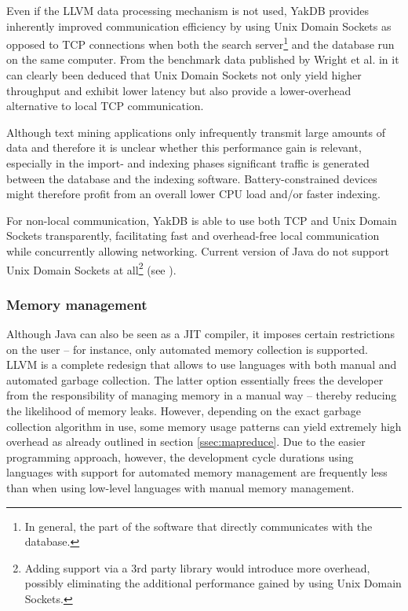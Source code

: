 \documentclass[a4paper, 12pt, twoside, reqn]{report}
\numberwithin{figure}{chapter}
\newtheorem[L]{boxedDefinition}{Definition}
\newtheorem[L]{boxedExample}{Example}
\begin{document}
Even if the LLVM data processing mechanism is not used, YakDB provides inherently improved communication efficiency by using Unix Domain Sockets as opposed to TCP connections when both the search server\footnote{In general, the part of the software that directly communicates with the database.} and the database run on the same computer. From the benchmark data published by Wright et al. in \cite{wright2007performance} it can clearly been deduced that Unix Domain Sockets not only yield higher throughput and exhibit lower latency but also provide a lower-overhead alternative to local TCP communication.

Although text mining applications only infrequently transmit large amounts of data and therefore it is unclear whether this performance gain is relevant, especially in the import- and indexing phases significant traffic is generated between the database and the indexing software. Battery-constrained devices might therefore profit from an overall lower CPU load and/or faster indexing.

For non-local communication, YakDB is able to use both TCP and Unix Domain Sockets transparently, facilitating fast and overhead-free local communication while concurrently allowing networking. Current version of Java do not support Unix Domain Sockets at all\footnote{Adding support via a 3rd party library would introduce more overhead, possibly eliminating the additional performance gained by using Unix Domain Sockets.} (see \cite{javaforum-unixsockets}).

\subsubsection{Memory management}\label{sssec:memory-management}

Although Java can also be seen as a JIT compiler, it imposes certain restrictions on the user -- for instance, only automated memory collection is supported. LLVM is a complete redesign that allows to use languages with both manual and automated garbage collection. The latter option essentially frees the developer from the responsibility of managing memory in a manual way -- thereby reducing the likelihood of memory leaks. However, depending on the exact garbage collection algorithm in use, some memory usage patterns can yield extremely high overhead as already outlined in section \ref{ssec:mapreduce}. Due to the easier programming approach, however, the development cycle durations using languages with support for automated memory management are frequently less than when using low-level languages with manual memory management.
\end{document}
